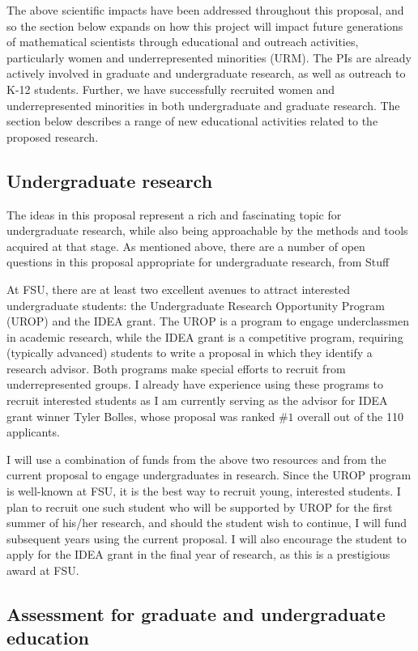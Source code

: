 \documentclass[12pt]{article}
\begin{document}
The above scientific impacts have been addressed throughout this proposal, and so the section below expands on how this project will impact future generations of mathematical scientists through educational and outreach activities, particularly women and underrepresented minorities (URM). 
The PIs are already actively involved in graduate and undergraduate research, as well as outreach to K-12 students. Further, we have successfully recruited women and underrepresented minorities in both undergraduate and graduate research. The section below describes a range of new educational activities related to the proposed research.


\subsection{Undergraduate research}
The ideas in this proposal represent a rich and fascinating topic for undergraduate research, while also being approachable by the methods and tools acquired at that stage. As mentioned above, there are a number of open questions in this proposal appropriate for undergraduate research, from {\color{blue} Stuff}
	
At FSU, there are at least two excellent avenues to attract interested undergraduate students:  the Undergraduate Research Opportunity Program (UROP) and the IDEA grant. The UROP is a program to engage underclassmen in academic research, while the IDEA grant is a competitive program, requiring (typically advanced) students to write a proposal in which they identify a research advisor. Both programs make special efforts to recruit from underrepresented groups. I already have experience using these programs to recruit interested students as I am currently serving as the advisor for IDEA grant winner Tyler Bolles, whose proposal was ranked $\#1$ overall out of the 110 applicants.

I will use a combination of funds from the above two resources and from the current proposal to engage undergraduates in research. Since the UROP program is well-known at FSU, it is the best way to recruit young, interested students. I plan to recruit one such student who will be supported by UROP for the first summer of his/her research, and should the student wish to continue, I will fund subsequent years using the current proposal. I will also encourage the student to apply for the IDEA grant in the final year of research, as this is a prestigious award at FSU. 


\subsection{Assessment for graduate and undergraduate education}
\end{document}
